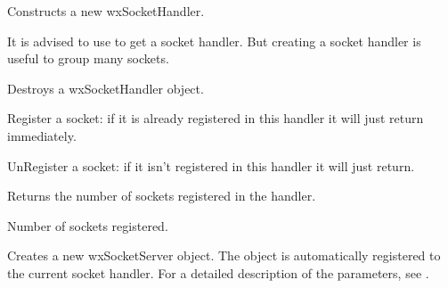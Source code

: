 %
%


Constructs a new wxSocketHandler.

It is advised to use  to
get a socket handler. But creating a socket handler is useful to group
many sockets.

%
%


Destroys a wxSocketHandler object.

%
%


Register a socket: if it is already registered in this handler it will just
return immediately.



%
%


UnRegister a socket: if it isn't registered in this handler it will just
return.



%
%


Returns the number of sockets registered in the handler.


Number of sockets registered.

%
%


Creates a new wxSocketServer object. The object is automatically registered
to the current socket handler.
For a detailed description of the parameters, see .

